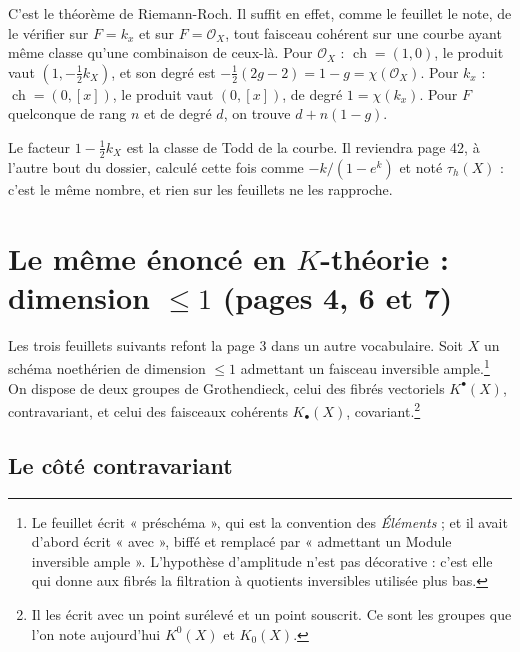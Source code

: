 \documentclass[11pt,a4paper]{article}
\begin{document}
C'est le théorème de Riemann-Roch. Il suffit en effet, comme le feuillet le
note, de le vérifier sur $F = k_{x}$ et sur $F = \mathcal{O}_{X}$, tout
faisceau cohérent sur une courbe ayant même classe qu'une combinaison de
ceux-là. Pour $\mathcal{O}_{X}$ : $\operatorname{ch} = (1,0)$, le produit vaut
$(1, -\tfrac12 k_{X})$, et son degré est $-\tfrac12(2g-2) = 1-g = \chi(\mathcal{O}_{X})$.
Pour $k_{x}$ : $\operatorname{ch} = (0, [x])$, le produit vaut $(0,[x])$, de
degré $1 = \chi(k_{x})$. Pour $F$ quelconque de rang $n$ et de degré $d$, on
trouve $d + n(1-g)$.

Le facteur $1 - \tfrac12 k_{X}$ est la classe de Todd de la courbe. Il
reviendra page 42, à l'autre bout du dossier, calculé cette fois comme
$-k/(1 - e^{k})$ et noté $\tau_{h}(X)$ : c'est le même nombre, et rien sur les
feuillets ne les rapproche.

\section*{Le même énoncé en $K$-théorie : dimension $\leqslant 1$ (pages 4, 6 et 7)}

Les trois feuillets suivants refont la page 3 dans un autre vocabulaire. Soit
$X$ un schéma noethérien de dimension $\leqslant 1$ admettant un faisceau
inversible ample.\footnote{Le feuillet écrit « préschéma », qui est la
convention des \emph{Éléments} ; et il avait d'abord écrit « avec », biffé et
remplacé par « admettant un Module inversible ample ». L'hypothèse d'amplitude
n'est pas décorative : c'est elle qui donne aux fibrés la filtration à quotients
inversibles utilisée plus bas.} On dispose de deux groupes de Grothendieck, celui des fibrés
vectoriels $K^{\bullet}(X)$, contravariant, et celui des faisceaux cohérents
$K_{\bullet}(X)$, covariant.\footnote{Il les écrit avec un point surélevé et un
point souscrit. Ce sont les groupes que l'on note aujourd'hui $K^{0}(X)$ et
$K_{0}(X)$.}

\subsection*{Le côté contravariant}
\end{document}
